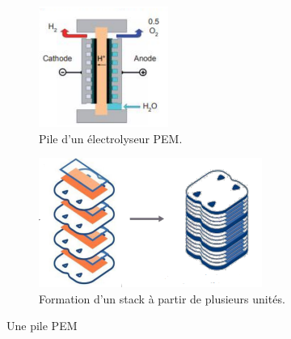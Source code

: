 \documentclass[11pt,french,a4paper]{article}
\begin{document}
\begin{figure}[h]
  \centering
  \begin{subfigure}[b]{0.3\linewidth}
    \includegraphics[width=\linewidth]{image/chap3/Figure 3.2.b-2.png}
    \caption{Pile d'un électrolyseur PEM.}
  \end{subfigure}
  \begin{subfigure}[b]{0.4\linewidth}
    \includegraphics[width=\linewidth]{image/chap3/Figure 3.2.b-3.png}
    \caption{Formation d’un stack à partir de plusieurs unités.}
  \end{subfigure}
  \caption{Une pile PEM}
\end{figure}
\end{document}
